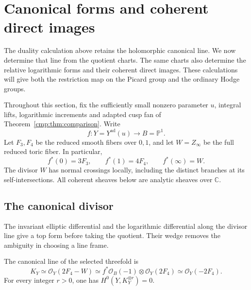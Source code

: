 \section{Canonical forms and coherent direct images}\label{sec:canonical-coherent}

The duality calculation above retains the holomorphic canonical line.
We now determine that line from the quotient charts. The same charts
also determine the relative logarithmic forms and their coherent
direct images. These calculations will give both the restriction map
on the Picard group and the ordinary Hodge groups.

Throughout this section, fix the sufficiently small nonzero parameter
$u$, integral lifts, logarithmic increments and adapted cusp fan of
Theorem~\ref{cmp:thm:comparison}. Write
\[
 f:Y=Y^{\mathrm{ad}}(u)\longrightarrow B=\mathbb P^1.
\]
Let $F_3,F_4$ be the reduced smooth fibers over $0,1$, and let
$W=Z_\infty$ be the full reduced toric fiber. In particular,
\begin{equation}\label{nf:eq:fiber-divisors}
 f^*(0)=3F_3,\qquad f^*(1)=4F_4,\qquad f^*(\infty)=W.
\end{equation}
The divisor $W$ has normal crossings locally, including the distinct
branches at its self-intersections. All coherent sheaves below are
analytic sheaves over $\mathbb C$.

\subsection{The canonical divisor}

The invariant elliptic differential and the logarithmic differential
along the divisor line give a top form before taking the quotient.
Their wedge removes the ambiguity in choosing a line frame.

\begin{theorem}\label{nf:thm:canonical}
The canonical line of the selected threefold is
\begin{equation}\label{nf:eq:canonical}
 K_Y\simeq\mathcal O_Y(2F_4-W)
     \simeq f^*\mathcal O_B(-1)\otimes\mathcal O_Y(2F_4)
     \simeq\mathcal O_Y(-2F_4).
\end{equation}
For every integer $r>0$, one has $H^0(Y,K_Y^{\otimes r})=0$.
\end{theorem}


